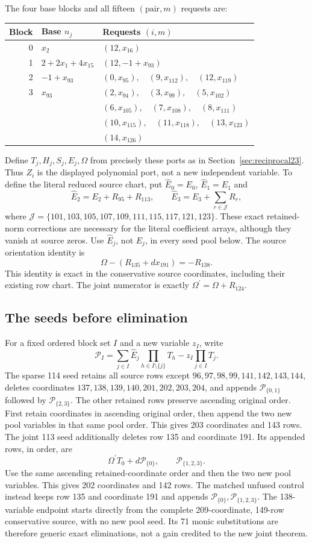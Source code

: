 The four base blocks and all fifteen $(\text{pair},m)$ requests are:
\begin{center}\small
\begin{tabular}{@{}rll@{}}\toprule
Block & Base $n_j$ & Requests $(i,m)$\\\midrule
0 & $x_{2}$ & $(12,x_{16})$\\
1 & $2+2x_{1}+4x_{15}$ & $(12,-1+x_{93})$\\
2 & $-1+x_{93}$ & $(0,x_{95}),\quad(9,x_{112}),\quad(12,x_{119})$\\
3 & $x_{93}$ & $(2,x_{94}),\quad(3,x_{99}),\quad(5,x_{102})$\\
 & & $(6,x_{105}),\quad(7,x_{108}),\quad(8,x_{111})$\\
 & & $(10,x_{115}),\quad(11,x_{118}),\quad(13,x_{123})$\\
 & & $(14,x_{126})$\\
\bottomrule\end{tabular}\end{center}
Define $T_j,H_j,S_j,E_j,\Omega$ from precisely these ports as in Section~\ref{sec:reciprocal23}. Thus $Z_i$ is the displayed polynomial port, not a new independent variable. To define the literal reduced source chart, put $\widehat E_0=E_0$, $\widehat E_1=E_1$ and
\[\widehat E_2=E_2+R_{95}+R_{113},\qquad \widehat E_3=E_3+\sum_{r\in\mathcal J}R_r,\]
where $\mathcal J=\{101,103,105,107,109,111,115,117,121,123\}$. These exact retained-norm corrections are necessary for the literal coefficient arrays, although they vanish at source zeros. Use $\widehat E_j$, not $E_j$, in every seed pool below. The source orientation identity is
\[\Omega-(R_{135}+d x_{191})=-R_{138}.\]
This identity is exact in the conservative source coordinates, including their existing row chart. The joint numerator is exactly $\Omega^{\prime}=\Omega+R_{124}$.
\subsection{The seeds before elimination}
For a fixed ordered block set $I$ and a new variable $z_I$, write
\[\mathcal P_I=\sum_{j\in I}\widehat E_j\prod_{h\in I\setminus\{j\}}T_h-z_I\prod_{j\in I}T_j.\]
The sparse 114 seed retains all source rows except $96,97,98,99,141,142,143,144$, deletes coordinates $137,138,139,140,201,202,203,204$, and appends $\mathcal P_{\{0,1\}}$ followed by $\mathcal P_{\{2,3\}}$. The other retained rows preserve ascending original order. First retain coordinates in ascending original order, then append the two new pool variables in that same pool order. This gives 203 coordinates and 143 rows.
The joint 113 seed additionally deletes row 135 and coordinate 191. Its appended rows, in order, are
\[\Omega^{\prime} T_0+d\mathcal P_{\{0\}},\qquad\mathcal P_{\{1,2,3\}}.\]
Use the same ascending retained-coordinate order and then the two new pool variables. This gives 202 coordinates and 142 rows. The matched unfused control instead keeps row 135 and coordinate 191 and appends $\mathcal P_{\{0\}},\mathcal P_{\{1,2,3\}}$.
The 138-variable endpoint starts directly from the complete 209-coordinate, 149-row conservative source, with no new pool seed. Its 71 monic substitutions are therefore generic exact eliminations, not a gain credited to the new joint theorem.
